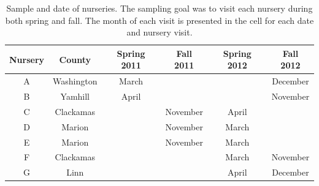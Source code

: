 \documentclass[12pt]{article}
\begin{document}
\begin{table}[!ht]
\caption{Sample and date of nurseries.  The sampling goal was to visit each nursery during both spring and fall.  The month of each visit is presented in the cell for each date and nursery visit.}
\begin{tabular}{cccccc}
\hline
\textbf{Nursery} & \textbf{County} & \textbf{Spring 2011} & \textbf{Fall 2011} & \textbf{Spring 2012} & \textbf{Fall 2012} \\
\hline
A & Washington & March & & & December \\
B & Yamhill & April & & & November \\
C & Clackamas & & November & April & \\
D & Marion & & November & March & \\
E & Marion & & November & March & \\
F & Clackamas & & & March & November \\
G & Linn & & & April & December \\
\hline
\end{tabular}
\label{tab:sample}
\end{table}
\end{document}
